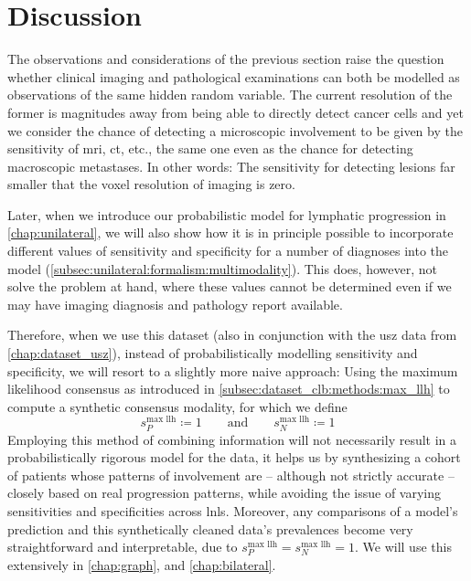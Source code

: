 \documentclass[\relativeRoot/main.tex]{subfiles}
\begin{document}
\section{Discussion}
\label{sec:dataset_clb:discussion}

The observations and considerations of the previous section raise the question whether clinical imaging and pathological examinations can both be modelled as observations of the same hidden random variable. The current resolution of the former is magnitudes away from being able to directly detect cancer cells and yet we consider the chance of detecting a microscopic involvement to be given by the sensitivity of \gls{mri}, \gls{ct}, etc., the same one even as the chance for detecting macroscopic metastases. In other words: The sensitivity for detecting lesions far smaller that the voxel resolution of imaging is zero.

Later, when we introduce our probabilistic model for lymphatic progression in \cref{chap:unilateral}, we will also show how it is in principle possible to incorporate different values of sensitivity and specificity for a number of diagnoses into the model (\cref{subsec:unilateral:formalism:multimodality}). This does, however, not solve the problem at hand, where these values cannot be determined even if we may have imaging diagnosis and pathology report available.

Therefore, when we use this dataset (also in conjunction with the \gls{usz} data from \cref{chap:dataset_usz}), instead of probabilistically modelling sensitivity and specificity, we will resort to a slightly more naive approach: Using the maximum likelihood consensus as introduced in \cref{subsec:dataset_clb:methods:max_llh} to compute a synthetic consensus modality, for which we define
%
\begin{equation}
    s_P^\text{max llh} \coloneqq 1 \qquad \text{and} \qquad s_N^\text{max llh} \coloneqq 1
\end{equation}
%
Employing this method of combining information will not necessarily result in a probabilistically rigorous model for the data, it helps us by synthesizing a cohort of patients whose patterns of involvement are -- although not strictly accurate -- closely based on real progression patterns, while avoiding the issue of varying sensitivities and specificities across \glspl{lnl}. Moreover, any comparisons of a model's prediction and this synthetically cleaned data's prevalences become very straightforward and interpretable, due to $s_P^\text{max llh} = s_N^\text{max llh} = 1$. We will use this extensively in \cref{chap:graph}, and \cref{chap:bilateral}.
\end{document}
